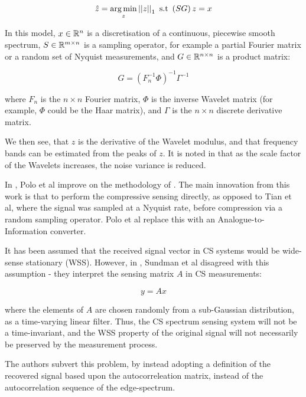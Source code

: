 \begin{equation}
\hat{z} = \operatorname*{arg\,min}_z \left|\left|z\right|\right|_1 \text{ s.t } \left(SG\right)z = x 
\end{equation}

In this model, \(x \in {\mathbb{R}}^n\) is a discretisation of a continuous, piecewise smooth spectrum, \(S \in {\mathbb{R}}^{m \times n}\) is a sampling operator, for example a partial Fourier matrix or a random set of Nyquist measurements, and \(G \in {\mathbb{R}}^{n \times n}\) is a product matrix:

\begin{equation}
G = \left(F_n^{-1} \Phi \right)^{-1}\Gamma^{-1}
\end{equation}

where \(F_n\) is the \(n \times n\) Fourier matrix, \(\Phi\) is the inverse Wavelet matrix (for example, \(\Phi\) could be the Haar matrix), and \(\Gamma\) is the \(n \times n\) discrete derivative matrix.

We then see, that \(z\) is the derivative of the Wavelet modulus, and that frequency bands can be estimated from the peaks of \(z\). It is noted in \cite{Tian2007} that as the scale factor of the Wavelets increases, the noise variance is reduced. 

In \cite{polo2009compressive}, Polo et al improve on the methodology of \cite{Tian2007}. The main innovation from this work is that to perform the compressive sensing directly, as opposed to Tian et al, where the signal was sampled at a Nyquist rate, before compression via a random sampling operator. Polo et al replace this with an Analogue-to-Information converter. 

It has been assumed that the received signal vector in CS systems would be wide-sense stationary (WSS). However, in \cite{sundman2010use}, Sundman et al disagreed with this assumption - they interpret the sensing matrix \(A\) in CS measurements:

\begin{equation}
y = Ax
\end{equation}

where the elements of \(A\) are chosen randomly from a sub-Gaussian distribution, as a time-varying linear filter. Thus, the CS spectrum sensing system will not be a time-invariant, and the WSS property of the original signal will not necessarily be preserved by the measurement process.

The authors subvert this problem, by instead adopting a definition of the recovered signal based upon the autocorreleation matrix, instead of the autocorrelation sequence of the edge-spectrum.

